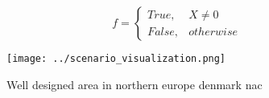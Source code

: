 \documentclass[a4paper]{article}
\begin{document}
\begin{equation}   f =
\begin{cases} True, & X \neq 0\\
False, & otherwise
\end{cases}
\end{equation}

\begin{figure}
\centering
\texttt{[image: ../scenario\_visualization.png]}
\caption{Well designed area in northern europe denmark nac
}
\end{figure}
 
\end{document}
